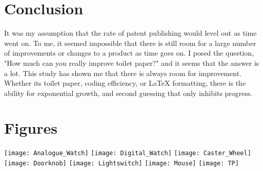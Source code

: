 \documentclass[12pt]{article}
\begin{document}
\section{Conclusion}\label{Sec_Conclusion}
It was my assumption that the rate of patent publishing would level out as time went on. To me, it seemed impossible that there is still room for a large number of improvements or changes to a product as time goes on. I posed the question, "How much can you really improve toilet paper?" and it seems that the answer is a lot. This study has shown me that there is always room for improvement. Whether its toilet paper, coding efficiency, or {\LaTeX} formatting, there is the ability for exponential growth, and second guessing that only inhibits progress.

\pagebreak
\section{Figures}\label{Sec_Figures}
\texttt{[image: Analogue\_Watch]}
\texttt{[image: Digital\_Watch]}
\texttt{[image: Caster\_Wheel]}
\texttt{[image: Doorknob]}
\texttt{[image: Lightswitch]}
\texttt{[image: Mouse]}
\texttt{[image: TP]}
\end{document}
